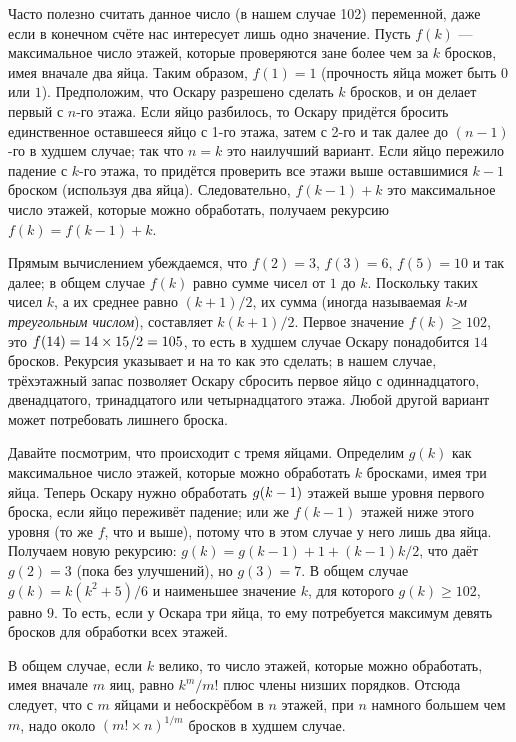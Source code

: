 Часто полезно считать данное число (в нашем случае 102) переменной, даже если в конечном счёте нас интересует лишь одно значение.
Пусть $f(k)$ --- максимальное число этажей, которые проверяются зане более чем за $k$ бросков, имея вначале два яйца.
Таким образом, $f(1) = 1$ (прочность яйца может быть $0$ или $1$).
Предположим, что Оскару разрешено сделать $k$ бросков, и он делает первый с $n$-го этажа.
Если яйцо разбилось, то Оскару придётся бросить единственное оставшееся яйцо с 1-го этажа, затем с 2-го и так далее до $(n-1)$-го в худшем случае;
так что $n = k$ это наилучший вариант.
Если яйцо пережило падение с $k$-го этажа, то придётся проверить все этажи выше оставшимися $k-1$ броском (используя два яйца).
Следовательно, $f(k - 1) + k$ это максимальное число этажей, которые можно обработать,
получаем рекурсию $f(k) = f(k - 1) + k$.

Прямым вычислением убеждаемся, что $f(2) = 3$, $f(3) = 6$, $f(5) = 10$ и так далее; в общем случае $f(k)$ равно сумме чисел от $1$ до $k$.
Поскольку таких чисел $k$, а их среднее равно $(k + 1)/2$, их сумма (иногда называемая \emph{$k$-м треугольным числом}), составляет $k(k + 1)/2$.
Первое значение $f(k)\ge 102$, это $f(14) \z= 14 \times 15/2 \z= 105$, то есть в худшем случае Оскару понадобится $14$ бросков.
Рекурсия указывает и на то как это сделать;
в нашем случае, трёхэтажный запас позволяет Оскару сбросить первое яйцо с одиннадцатого, двенадцатого, тринадцатого или четырнадцатого этажа.
Любой другой вариант может потребовать лишнего броска.

Давайте посмотрим, что происходит с тремя яйцами.
Определим $g(k)$ как максимальное число этажей, которые можно обработать $k$ бросками, имея три яйца.
Теперь Оскару нужно обработать $g(k \z- 1)$ этажей выше уровня первого броска, если яйцо переживёт падение;
или же $f(k - 1)$ этажей ниже этого уровня (то же $f$, что и выше), потому что в этом случае у него лишь два яйца.
Получаем новую рекурсию: $g(k) = g(k-1) + 1 + (k - 1)k/2$, что даёт $g(2) = 3$ (пока без улучшений), но $g(3) = 7$.
В общем случае $g(k)=k(k^2+5)/6$ и наименьшее значение $k$, для которого $g(k)\ge 102$, равно $9$.
То есть, если у Оскара три яйца, то ему потребуется максимум девять бросков для обработки всех этажей.

В общем случае, если $k$ велико, то число этажей, которые можно обработать, имея вначале $m$ яиц, равно $k^m/m!$ плюс члены низших порядков.
Отсюда следует, что с $m$ яйцами и небоскрёбом в $n$ этажей, при $n$ намного большем чем $m$, надо около $(m!\times n)^{1/m}$ бросков в худшем случае.

